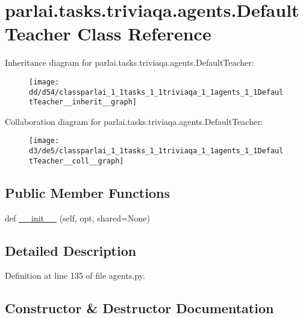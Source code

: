 \hypertarget{classparlai_1_1tasks_1_1triviaqa_1_1agents_1_1DefaultTeacher}{}\section{parlai.\+tasks.\+triviaqa.\+agents.\+Default\+Teacher Class Reference}
\label{classparlai_1_1tasks_1_1triviaqa_1_1agents_1_1DefaultTeacher}


Inheritance diagram for parlai.\+tasks.\+triviaqa.\+agents.\+Default\+Teacher\+:\nopagebreak
\begin{figure}[H]
\begin{center}
\leavevmode
\texttt{[image: dd/d54/classparlai\_1\_1tasks\_1\_1triviaqa\_1\_1agents\_1\_1DefaultTeacher\_\_inherit\_\_graph]}
\end{center}
\end{figure}


Collaboration diagram for parlai.\+tasks.\+triviaqa.\+agents.\+Default\+Teacher\+:\nopagebreak
\begin{figure}[H]
\begin{center}
\leavevmode
\texttt{[image: d3/de5/classparlai\_1\_1tasks\_1\_1triviaqa\_1\_1agents\_1\_1DefaultTeacher\_\_coll\_\_graph]}
\end{center}
\end{figure}
\subsection*{Public Member Functions}
\begin{DoxyCompactItemize}
\item 
def \hyperlink{classparlai_1_1tasks_1_1triviaqa_1_1agents_1_1DefaultTeacher_aab891504cebc2c749a658d8102d8fbce}{\+\_\+\+\_\+init\+\_\+\+\_\+} (self, opt, shared=None)
\end{DoxyCompactItemize}


\subsection{Detailed Description}


Definition at line 135 of file agents.\+py.



\subsection{Constructor \& Destructor Documentation}
\mbox{\label{classparlai_1_1tasks_1_1triviaqa_1_1agents_1_1DefaultTeacher_aab891504cebc2c749a658d8102d8fbce}} 
